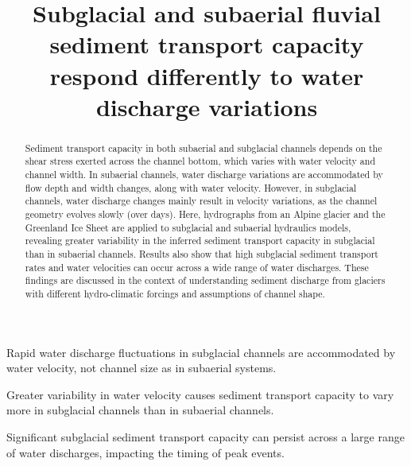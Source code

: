 \documentclass[draft]{agujournal2019}
\begin{document}
\title{Subglacial and subaerial fluvial sediment transport capacity respond differently to water discharge variations}




\begin{keypoints}
\item Rapid water discharge fluctuations in subglacial channels are accommodated by water velocity, not channel size as in subaerial systems.
\item Greater variability in water velocity causes sediment transport capacity to vary more in subglacial channels than in subaerial channels.
\item Significant subglacial sediment transport capacity can persist across a large range of water discharges, impacting  the timing of peak events.
\end{keypoints}

\begin{abstract}
  Sediment transport capacity in both subaerial and subglacial channels depends on the shear stress exerted across the channel bottom, which varies with water velocity and channel width.
  In subaerial channels, water discharge variations are accommodated  by flow depth and width changes, along with water velocity.
  However, in subglacial channels,  water discharge changes mainly result in velocity variations, as the channel geometry evolves slowly (over days).
  Here, hydrographs from an Alpine glacier and the Greenland Ice Sheet are applied to subglacial and subaerial hydraulics models, revealing greater variability in the inferred sediment transport capacity in subglacial than in subaerial channels.
  Results also show that high subglacial sediment transport rates and water velocities can occur across a wide range of water discharges.
  These findings are discussed in the context of understanding sediment discharge from glaciers with different hydro-climatic forcings and assumptions of channel shape.
\end{abstract}
\end{document}
